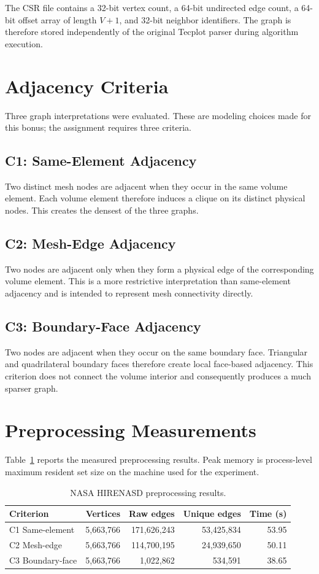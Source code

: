 \documentclass[11pt]{article}
\begin{document}
The CSR file contains a 32-bit vertex count, a 64-bit undirected edge count, a 64-bit offset array of length $V+1$, and 32-bit neighbor identifiers. The graph is therefore stored independently of the original Tecplot parser during algorithm execution.

\section{Adjacency Criteria}
Three graph interpretations were evaluated. These are modeling choices made for this bonus; the assignment requires three criteria.

\subsection{C1: Same-Element Adjacency}
Two distinct mesh nodes are adjacent when they occur in the same volume element. Each volume element therefore induces a clique on its distinct physical nodes. This creates the densest of the three graphs.

\subsection{C2: Mesh-Edge Adjacency}
Two nodes are adjacent only when they form a physical edge of the corresponding volume element. This is a more restrictive interpretation than same-element adjacency and is intended to represent mesh connectivity directly.

\subsection{C3: Boundary-Face Adjacency}
Two nodes are adjacent when they occur on the same boundary face. Triangular and quadrilateral boundary faces therefore create local face-based adjacency. This criterion does not connect the volume interior and consequently produces a much sparser graph.

\section{Preprocessing Measurements}
Table~\ref{tab:bonus-preprocessing} reports the measured preprocessing results. Peak memory is process-level maximum resident set size on the machine used for the experiment.

\begin{table}[H]
\centering
\caption{NASA HIRENASD preprocessing results.}
\label{tab:bonus-preprocessing}
\small
\begin{tabular}{lrrrr}
\toprule
Criterion & Vertices & Raw edges & Unique edges & Time (s)\\
\midrule
C1 Same-element & 5,663,766 & 171,626,243 & 53,425,834 & 53.95\\
C2 Mesh-edge & 5,663,766 & 114,700,195 & 24,939,650 & 50.11\\
C3 Boundary-face & 5,663,766 & 1,022,862 & 534,591 & 38.65\\
\bottomrule
\end{tabular}
\end{table}
\end{document}
